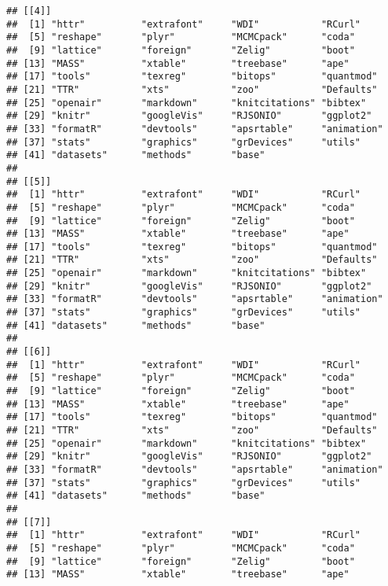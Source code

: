 \begin{knitrout}
\begin{kframe}
\begin{verbatim}
## [[4]]
##  [1] "httr"          "extrafont"     "WDI"           "RCurl"        
##  [5] "reshape"       "plyr"          "MCMCpack"      "coda"         
##  [9] "lattice"       "foreign"       "Zelig"         "boot"         
## [13] "MASS"          "xtable"        "treebase"      "ape"          
## [17] "tools"         "texreg"        "bitops"        "quantmod"     
## [21] "TTR"           "xts"           "zoo"           "Defaults"     
## [25] "openair"       "markdown"      "knitcitations" "bibtex"       
## [29] "knitr"         "googleVis"     "RJSONIO"       "ggplot2"      
## [33] "formatR"       "devtools"      "apsrtable"     "animation"    
## [37] "stats"         "graphics"      "grDevices"     "utils"        
## [41] "datasets"      "methods"       "base"         
## 
## [[5]]
##  [1] "httr"          "extrafont"     "WDI"           "RCurl"        
##  [5] "reshape"       "plyr"          "MCMCpack"      "coda"         
##  [9] "lattice"       "foreign"       "Zelig"         "boot"         
## [13] "MASS"          "xtable"        "treebase"      "ape"          
## [17] "tools"         "texreg"        "bitops"        "quantmod"     
## [21] "TTR"           "xts"           "zoo"           "Defaults"     
## [25] "openair"       "markdown"      "knitcitations" "bibtex"       
## [29] "knitr"         "googleVis"     "RJSONIO"       "ggplot2"      
## [33] "formatR"       "devtools"      "apsrtable"     "animation"    
## [37] "stats"         "graphics"      "grDevices"     "utils"        
## [41] "datasets"      "methods"       "base"         
## 
## [[6]]
##  [1] "httr"          "extrafont"     "WDI"           "RCurl"        
##  [5] "reshape"       "plyr"          "MCMCpack"      "coda"         
##  [9] "lattice"       "foreign"       "Zelig"         "boot"         
## [13] "MASS"          "xtable"        "treebase"      "ape"          
## [17] "tools"         "texreg"        "bitops"        "quantmod"     
## [21] "TTR"           "xts"           "zoo"           "Defaults"     
## [25] "openair"       "markdown"      "knitcitations" "bibtex"       
## [29] "knitr"         "googleVis"     "RJSONIO"       "ggplot2"      
## [33] "formatR"       "devtools"      "apsrtable"     "animation"    
## [37] "stats"         "graphics"      "grDevices"     "utils"        
## [41] "datasets"      "methods"       "base"         
## 
## [[7]]
##  [1] "httr"          "extrafont"     "WDI"           "RCurl"        
##  [5] "reshape"       "plyr"          "MCMCpack"      "coda"         
##  [9] "lattice"       "foreign"       "Zelig"         "boot"         
## [13] "MASS"          "xtable"        "treebase"      "ape"          

\end{verbatim}
\end{kframe}
\end{knitrout}

